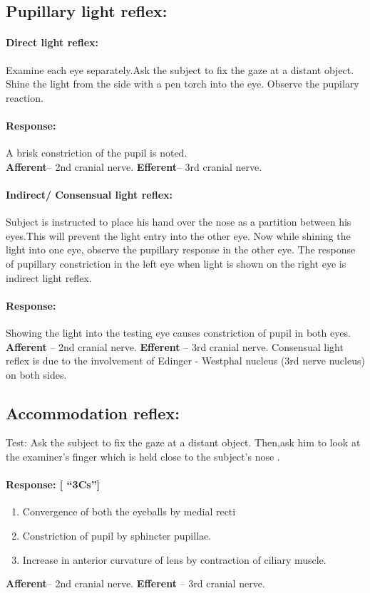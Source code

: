 \documentclass[a4paper,12pt,openany,oneside]{book}
\begin{document}
			\subsection*{Pupillary light reflex:}
			\paragraph{Direct light reflex:}Examine each eye separately.Ask the subject to fix the gaze at a distant object. Shine the light from the side with a pen torch into the eye. Observe the pupilary reaction.
			\paragraph{Response:} A brisk constriction of the pupil is noted.\\ 
			\textbf{Afferent}– 2nd cranial nerve.
			\textbf{Efferent}– 3rd cranial nerve.
			\paragraph{Indirect/ Consensual light reflex:}
			Subject is instructed to place his hand over the nose as a partition between his eyes.This will prevent the light entry into the other eye. Now while shining the light into one eye, observe the pupillary response in the other eye. The response of pupillary constriction in the left eye when light is shown on the right eye is indirect light reflex.
			\paragraph{Response:}
			Showing the light into the testing eye causes constriction of pupil in both eyes.\\ 
			\textbf{Afferent} 	– 	2nd cranial nerve.
			\textbf{Efferent} 	– 	3rd cranial nerve. 
			Consensual light reflex is due to the involvement of Edinger - Westphal nucleus           (3rd nerve nucleus) on both sides.
			\subsection*{Accommodation reflex:}
			Test: Ask the subject to fix the gaze at a distant object. Then,ask him to look at the examiner’s finger which is held close to the subject’s nose .
			\paragraph{Response: [ “3Cs”]}
			\begin{enumerate}
\item{Convergence of both the eyeballs by medial recti}
\item{Constriction of pupil by sphincter pupillae.}
\item{Increase in anterior curvature of lens by contraction of ciliary muscle. }
			\end{enumerate}
			\textbf{Afferent}– 2nd cranial nerve.
			\textbf{Efferent} – 3rd cranial nerve.
\end{document}
